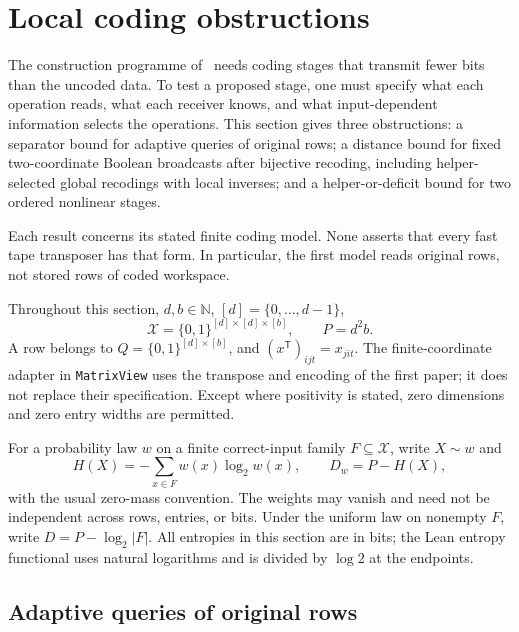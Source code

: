 \section{Local coding obstructions}\label{sec:local-coding}

The construction programme of~\cite{FirstPaper2026} needs coding stages that
transmit fewer bits than the uncoded data.  To test a proposed stage, one must
specify what each operation reads, what each receiver knows, and what
input-dependent information selects the operations.  This section gives three
obstructions: a separator bound for adaptive queries of original rows; a
distance bound for fixed two-coordinate Boolean broadcasts after bijective
recoding, including helper-selected global recodings with local inverses; and
a helper-or-deficit bound for two ordered nonlinear stages.

Each result concerns its stated finite coding model.  None asserts that every
fast tape transposer has that form.  In particular, the first model reads
original rows, not stored rows of coded workspace.

Throughout this section, $d,b\in\mathbb N$, $[d]=\{0,\ldots,d-1\}$,
\[
  \mathcal X=\{0,1\}^{[d]\times[d]\times[b]},\qquad P=d^2b.
\]
A row belongs to $Q=\{0,1\}^{[d]\times[b]}$, and
$(x^{\mathsf T})_{ijt}=x_{jit}$.  The finite-coordinate adapter in
\texttt{MatrixView} uses the transpose and encoding of the first paper; it
does not replace their specification.  Except where positivity is stated,
zero dimensions and zero entry widths are permitted.

For a probability law $w$ on a finite correct-input family $F\subseteq\mathcal X$,
write $X\sim w$ and
\[
  H(X)=-\sum_{x\in F}w(x)\log_2 w(x),\qquad D_w=P-H(X),
\]
with the usual zero-mass convention.  The weights may vanish and need not be
independent across rows, entries, or bits.  Under the uniform law on nonempty
$F$, write $D=P-\log_2|F|$.  All entropies in this section are in bits; the Lean
entropy functional uses natural logarithms and is divided by $\log 2$ at the
endpoints.

\subsection{Adaptive queries of original rows}\label{subsec:local-adaptive}

